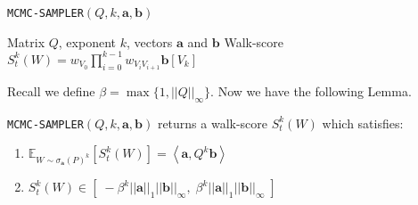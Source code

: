 \begin{algorithm}[ht]
\caption{\texttt{MCMC-SAMPLER}$(Q, k, \mathbf{a}, \mathbf{b})$}
\label{alg:fwalk}
\begin{algorithmic}[1]
\REQUIRE Matrix $Q$, exponent $k$, vectors $\mathbf{a}$ and $\mathbf{b}$
\RETURN Walk-score $S_{t}^k(W) = w_{V_0}\prod_{i=0}^{k-1}w_{V_iV_{i+1}}\mathbf{b}[V_{k}]$
\end{algorithmic}
\end{algorithm} 


Recall we define $\beta = \max\{1,||Q||_{\infty}\}$. 
Now we have the following Lemma.
\begin{lemma}
\texttt{MCMC-SAMPLER}$(Q, k,\mathbf{a},\mathbf{b})$ returns a walk-score $S_{t}^k(W)$ which satisfies:
\begin{enumerate}
\item $\mathbb{E}_{W \sim \sigma_{\mathbf{a}}(P)^k} \left[S_{t}^k(W)\right] = \left<\mathbf{a}, Q^k\mathbf{b} \right>$
\item $S_{t}^{k}(W) \in [\;-\beta^k||\mathbf{a}||_1||\mathbf{b}||_{\infty} ,\; \beta^k||\mathbf{a}||_1||\mathbf{b}||_{\infty} \;]$
\end{enumerate}
\end{lemma}


